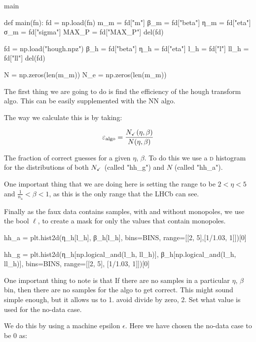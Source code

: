 \documentclass[10pt, a4paper]{article}
\begin{document}
\begin{codeblock}{main}
\begin{code}
def main(fn):
	fd = np.load(fn)
	m_m = fd["m"]
	β_m = fd["beta"]
	η_m = fd["eta"]
	σ_m = fd["sigma"]
	MAX_P = fd["MAX_P"]
	del(fd)
	
	fd = np.load("hough.npz")
	β_h  = fd["beta"]
	η_h  = fd["eta"]
	l_h  = fd["l"]
	ll_h = fd["ll"]
	del(fd)
	
	N = np.zeros(len(m_m))
	N_e = np.zeros(len(m_m))
\end{code}

The first thing we are going to do is find the efficiency of the hough transform algo. This can be easily supplemented with the NN algo.

The way we calculate this is by taking: 

\begin{equation}
\varepsilon_\text{algo} = \frac{N_\text{\checkmark}(\eta, \beta)}{N(\eta, \beta)}
\end{equation}

The fraction of correct guesses for a given $\eta$, $\beta$. To do this we use a \textsc{d} histogram for the distributions of both $N_\text{\checkmark}$ (called "hh_g") and $N$ (called "hh_a").

One important thing that we are doing here is setting the range to be $2 < \eta < 5$ and $\frac{1}{n_\text{a}} < \beta < 1$, as this is the only range that the LHCb can see. 

Finally as the faux data contains samples, with and without monopoles, we use the bool $\ell$, to create a mask for only the values that contain monopoles. 

\begin{code}
	hh_a = plt.hist2d(η_h[l_h],
	                  β_h[l_h],
	                  bins=BINS,
	                  range=[[2, 5],[1/1.03, 1]])[0]
	
	hh_g = plt.hist2d(η_h[np.logical_and(l_h, ll_h)],
	                  β_h[np.logical_and(l_h, ll_h)],
	                  bins=BINS,
	                  range=[[2, 5], [1/1.03, 1]])[0]
\end{code}

One important thing to note is that If there are no samples in a particular $\eta$, $\beta$ bin, then there are no samples for the algo to get correct. 
This might sound simple enough, but it allows us to 1. avoid divide by zero, 2. Set what value is used for the no-data case. 

We do this by using a machine epsilon $\epsilon$. Here we have chosen the no-data case to be $0$ as:


\end{codeblock}
\end{document}
